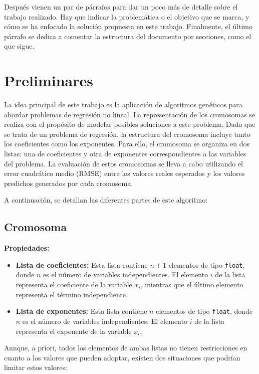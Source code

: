 \documentclass[conference,a4paper]{IEEEtran}
\begin{document}
Después vienen un par de párrafos para dar un poco más de detalle sobre el
trabajo realizado. Hay que indicar la problemática o el objetivo que se marca,
y cómo se ha enfocado la solución propuesta en este trabajo. Finalmente, el
último párrafo se dedica a comentar la estructura del documento por secciones,
como el que sigue.


\section{Preliminares}


La idea principal de este trabajo es la aplicación de algoritmos genéticos para abordar problemas de regresión no lineal. La representación de los cromosomas se realiza con el propósito de modelar posibles soluciones a este problema. Dado que se trata de un problema de regresión, la estructura del cromosoma incluye tanto los coeficientes como los exponentes. Para ello, el cromosoma se organiza en dos listas: una de coeficientes y otra de exponentes correspondientes a las variables del problema. La evaluación de estos cromosomas se lleva a cabo utilizando el error cuadrático medio (RMSE) entre los valores reales esperados y los valores predichos generados por cada cromosoma.

A continuación, se detallan las diferentes partes de este algoritmo:

\subsection{Cromosoma}

\textbf{Propiedades:}
\begin{itemize}
    \item \textbf{Lista de coeficientes:} Esta lista contiene \( n + 1 \) elementos de tipo \texttt{float}, donde \( n \) es el número de variables independientes. El elemento \( i \) de la lista representa el coeficiente de la variable \( x_i \), mientras que el último elemento representa el término independiente.
    \item \textbf{Lista de exponentes:} Esta lista contiene \( n \) elementos de tipo \texttt{float}, donde \( n \) es el número de variables independientes. El elemento \( i \) de la lista representa el exponente de la variable \( x_i \).    
\end{itemize}

Aunque, a priori, todos los elementos de ambas listas no tienen restricciones en cuanto a los valores que pueden adoptar, existen dos situaciones que podrían limitar estos valores:
\end{document}
